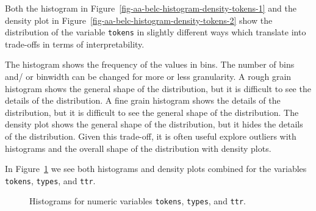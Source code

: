 \documentclass[
  letterpaper,
  DIV=11,
  numbers=noendperiod]{scrreprt}
\theoremstyle{definition}
\theoremstyle{remark}
\begin{document}
Both the histogram in
Figure~\ref{fig-aa-belc-histogram-density-tokens-1} and the density plot
in Figure~\ref{fig-aa-belc-histogram-density-tokens-2} show the
distribution of the variable \texttt{tokens} in slightly different ways
which translate into trade-offs in terms of interpretability.

The histogram shows the frequency of the values in bins. The number of
bins and/ or binwidth can be changed for more or less granularity. A
rough grain histogram shows the general shape of the distribution, but
it is difficult to see the details of the distribution. A fine grain
histogram shows the details of the distribution, but it is difficult to
see the general shape of the distribution. The density plot shows the
general shape of the distribution, but it hides the details of the
distribution. Given this trade-off, it is often useful explore outliers
with histograms and the overall shape of the distribution with density
plots.

In Figure~\ref{fig-aa-belc-histograms} we see both histograms and
density plots combined for the variables \texttt{tokens},
\texttt{types}, and \texttt{ttr}.

\begin{figure}[H]

\begin{minipage}{0.33\linewidth}



\end{minipage}%
%
\begin{minipage}{0.33\linewidth}



\end{minipage}%
%
\begin{minipage}{0.33\linewidth}



\end{minipage}%

\caption{\label{fig-aa-belc-histograms}Histograms for numeric variables
\texttt{tokens}, \texttt{types}, and \texttt{ttr}.}

\end{figure}%
\end{document}
